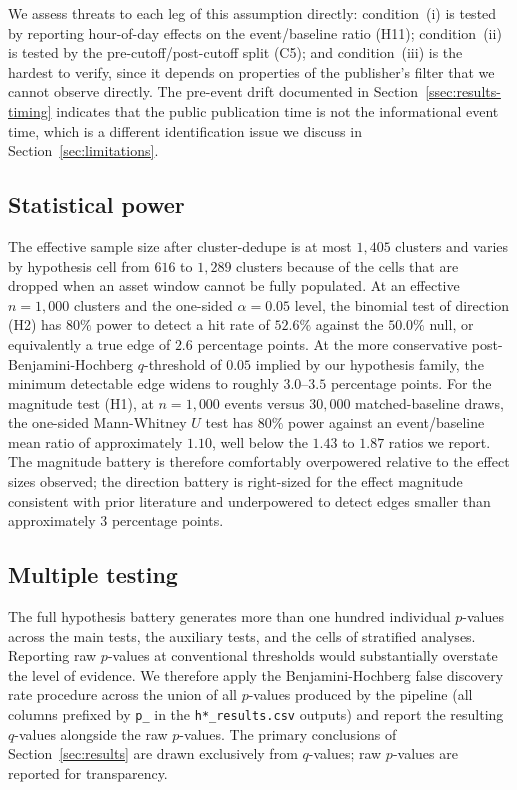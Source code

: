 We assess threats to each leg of this assumption directly:
condition~(i) is tested by reporting hour-of-day effects on the
event/baseline ratio (H11); condition~(ii) is tested by the
pre-cutoff/post-cutoff split (C5); and condition~(iii) is the
hardest to verify, since it depends on properties of the
publisher's filter that we cannot observe directly. The
pre-event drift documented in Section~\ref{ssec:results-timing}
indicates that the public publication time is not the
informational event time, which is a different identification
issue we discuss in
Section~\ref{sec:limitations}.

\subsection{Statistical power}
\label{ssec:power}

The effective sample size after cluster-dedupe is at most $1{,}405$
clusters and varies by hypothesis cell from $616$ to $1{,}289$
clusters because of the cells that are dropped when an asset window
cannot be fully populated. At an effective $n = 1{,}000$ clusters
and the one-sided $\alpha = 0.05$ level, the binomial test of
direction (H2) has $80\%$ power to detect a hit rate of $52.6\%$
against the $50.0\%$ null, or equivalently a true edge of
$2.6$ percentage points. At the more conservative
post-Benjamini-Hochberg $q$-threshold of $0.05$ implied by our
hypothesis family, the minimum detectable edge widens to roughly
$3.0$--$3.5$ percentage points. For the magnitude test (H1), at
$n = 1{,}000$ events versus $30{,}000$ matched-baseline draws, the
one-sided Mann-Whitney $U$ test has $80\%$ power against an
event/baseline mean ratio of approximately $1.10$, well below the
$1.43$ to $1.87$ ratios we report. The magnitude battery is
therefore comfortably overpowered relative to the effect sizes
observed; the direction battery is right-sized for the effect
magnitude consistent with prior literature
\citep{tetlock2007giving,heston2017news} and underpowered to detect
edges smaller than approximately $3$ percentage points.

\subsection{Multiple testing}
\label{ssec:multiple-testing}

The full hypothesis battery generates more than one hundred
individual $p$-values across the main tests, the auxiliary tests,
and the cells of stratified analyses. Reporting raw $p$-values at
conventional thresholds would substantially overstate the level of
evidence. We therefore apply the Benjamini-Hochberg false discovery
rate procedure \citep{benjamini1995controlling} across the union of
all $p$-values produced by the pipeline (all columns prefixed by
\texttt{p\_} in the \texttt{h*\_results.csv} outputs) and report the
resulting $q$-values alongside the raw $p$-values. The primary
conclusions of Section~\ref{sec:results} are drawn exclusively from
$q$-values; raw $p$-values are reported for transparency.

